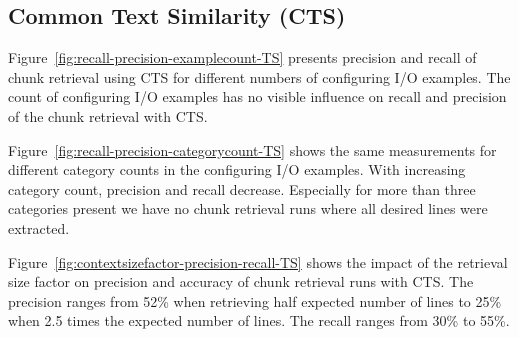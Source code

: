 \documentclass[\myrootdir/main.tex]{subfiles}
\begin{document}
\subsection{Common Text Similarity (CTS)}
Figure~\ref{fig:recall-precision-examplecount-TS} presents precision and recall of chunk retrieval using CTS for different numbers of configuring I/O examples.
The count of configuring I/O examples has no visible influence on recall and precision of the chunk retrieval with CTS.

Figure~\ref{fig:recall-precision-categorycount-TS} shows the same measurements for different category counts in the configuring I/O examples.
With increasing category count, precision and recall decrease.
Especially for more than three categories present we have no chunk retrieval runs where all desired lines were extracted.

Figure~\ref{fig:contextsizefactor-precision-recall-TS} shows the impact of the retrieval size factor on precision and accuracy of chunk retrieval runs with CTS.
The precision ranges from 52\% when retrieving half expected number of lines to 25\% when 2.5 times the expected number of lines.
The recall ranges from 30\% to 55\%.
\end{document}
